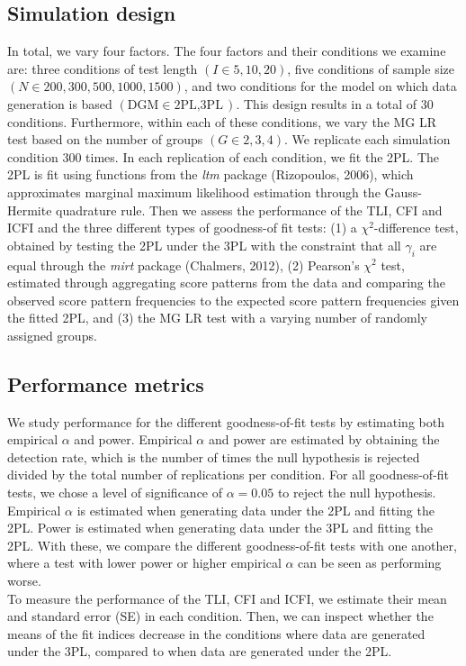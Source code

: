 \documentclass[Royal,sageapa,times,doublespace]{sagej}
\begin{document}
\subsection{Simulation design}
In total, we vary four factors. The four factors and their conditions we examine are: three conditions of test length
$(I \in{5,10,20})$, five conditions of sample size $(N \in{200, 300, 500, 1000, 1500})$, and two conditions for the model on which data generation is based $(\text{DGM} \in{\text{2PL}, \text{3PL}})$. This design results in a total of $30$ conditions. Furthermore, within each of these conditions, we vary the MG LR test based on the number of groups $(G \in{2, 3, 4})$. We replicate each simulation condition 300 times. In each replication of each condition, we fit the 2PL. The 2PL is fit using functions from the \textit{ltm} package (Rizopoulos, 2006), which approximates marginal maximum likelihood estimation through the Gauss-Hermite quadrature rule. Then we assess the performance of the TLI, CFI and ICFI and the three different types of goodness-of fit tests: (1) a $\chi^2$-difference test, obtained by testing the 2PL under the 3PL with the constraint that all $\gamma_i$ are equal through the \textit{mirt} package (Chalmers, 2012), (2) Pearson's $\chi^2$ test, estimated through aggregating score patterns from the data and comparing the observed score pattern frequencies to the expected score pattern frequencies given the fitted 2PL, and (3) the MG LR test with a varying number of randomly assigned groups. 
\subsection{Performance metrics}
We study performance for the different goodness-of-fit tests by estimating both empirical $\alpha$ and power. Empirical $\alpha$ and power are estimated by obtaining the detection rate, which is the number of times the null hypothesis is rejected divided by the total number of replications per condition. For all goodness-of-fit tests, we chose a level of significance of $\alpha = 0.05$ to reject the null hypothesis. Empirical $\alpha$ is estimated when generating data under the 2PL and fitting the 2PL. Power is estimated when generating data under the 3PL and fitting the 2PL. With these, we compare the different goodness-of-fit tests with one another, where a test with lower power or higher empirical $\alpha$ can be seen as performing worse. \\
\indent To measure the performance of the TLI, CFI and ICFI, we estimate their mean and standard error (SE) in each condition. Then, we can inspect whether the means of the fit indices decrease in the conditions where data are generated under the 3PL, compared to when data are generated under the 2PL. 
\end{document}
